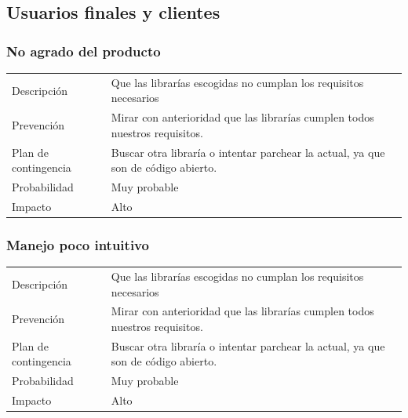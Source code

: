 \subsection{Usuarios finales y clientes}
\subsubsection{No agrado del producto}

\begin{table}[h]
    \begin{center}
        \begin{tabular}{l p{8cm}}
            Descripci\'{o}n                 & Que las librar\'{i}as escogidas no cumplan los requisitos necesarios \\
            Prevenci\'{o}n                  & Mirar con anterioridad que las librar\'{i}as cumplen todos nuestros requisitos. \\ 
            Plan de contingencia            & Buscar otra librar\'{i}a o intentar parchear la actual, ya que son de c\'{o}digo abierto. \\
            Probabilidad                    & Muy probable \\
            Impacto                         & Alto \\
        \end{tabular}
    \end{center}
    
\end{table}

\subsubsection{Manejo poco intuitivo}
\begin{table}[h]
    \begin{center}
        \begin{tabular}{l p{8cm}}
            Descripci\'{o}n                 & Que las librar\'{i}as escogidas no cumplan los requisitos necesarios \\
            Prevenci\'{o}n                  & Mirar con anterioridad que las librar\'{i}as cumplen todos nuestros requisitos. \\ 
            Plan de contingencia            & Buscar otra librar\'{i}a o intentar parchear la actual, ya que son de c\'{o}digo abierto. \\
            Probabilidad                    & Muy probable \\
            Impacto                         & Alto \\
        \end{tabular}
    \end{center}
    
\end{table}

